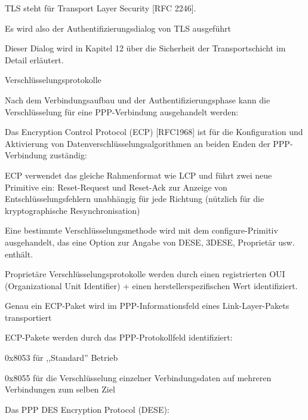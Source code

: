 \documentclass[a4paper]{article}
\begin{document}
\begin{multicols}{3}
\begin{itemize*}
            \begin{itemize*}
                  \item TLS steht für Transport Layer Security {[}RFC 2246{]}.
                  \item Es wird also der Authentifizierungsdialog von TLS ausgeführt
                  \item Dieser Dialog wird in Kapitel 12 über die Sicherheit der Transportschicht im Detail erläutert.
            \end{itemize*}
      \end{itemize*}

      Verschlüsselungsprotokolle

      \begin{itemize*}
            \item
            Nach dem Verbindungsaufbau und der Authentifizierungsphase kann die
            Verschlüsselung für eine PPP-Verbindung ausgehandelt werden:

            \begin{itemize*}
                  \item Das Encryption Control Protocol (ECP) {[}RFC1968{]} ist für die Konfiguration und Aktivierung von Datenverschlüsselungsalgorithmen an beiden Enden der PPP-Verbindung zuständig:
                  \begin{itemize*} \item ECP verwendet das gleiche Rahmenformat wie LCP und führt zwei neue Primitive ein: Reset-Request und Reset-Ack zur Anzeige von Entschlüsselungsfehlern unabhängig für jede Richtung (nützlich für die kryptographische Resynchronisation) \item Eine bestimmte Verschlüsselungsmethode wird mit dem configure-Primitiv ausgehandelt, das eine Option zur Angabe von DESE, 3DESE, Proprietär usw. enthält. \item Proprietäre Verschlüsselungsprotokolle werden durch einen registrierten OUI (Organizational Unit Identifier) + einen herstellerspezifischen Wert identifiziert. \item Genau ein ECP-Paket wird im PPP-Informationsfeld eines Link-Layer-Pakets transportiert \item ECP-Pakete werden durch das PPP-Protokollfeld identifiziert:
                        \begin{itemize*} \item 0x8053 für ,,Standard'' Betrieb \item 0x8055 für die Verschlüsselung einzelner Verbindungsdaten auf mehreren Verbindungen zum selben Ziel \end{itemize*} \end{itemize*}
            \end{itemize*}
            \item
            Das PPP DES Encryption Protocol (DESE):


\end{itemize*}
\end{multicols}
\end{document}
